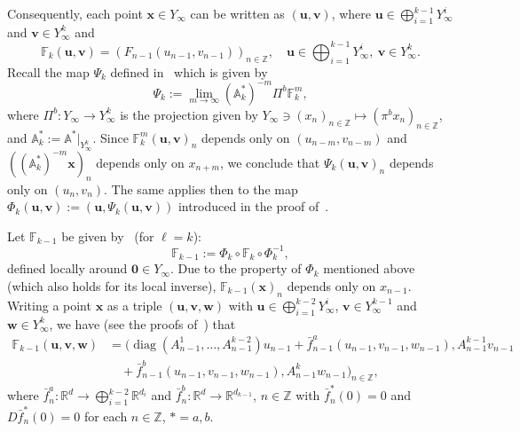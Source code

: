 \documentclass[reqno, a4paper, 10pt]{amsart}
\theoremstyle{plain}
\numberwithin{equation}{section}
\theoremstyle{remark}
\DeclareMathOperator{\diag}{diag}
\begin{document}
Consequently, each point $\mathbf x\in Y_\infty$ can be written as $(\mathbf u, \mathbf v)$, where $\mathbf u\in \bigoplus_{i=1}^{k-1}Y_\infty^i$ and $\mathbf v\in Y_\infty^k$ and
\[
\mathbb F_k(\mathbf u, \mathbf v)=(F_{n-1}(u_{n-1}, v_{n-1}))_{n\in \mathbb Z}, \quad \mathbf u\in \bigoplus_{i=1}^{k-1}Y_\infty^i, \ \mathbf v\in Y_\infty^k.
\]
Recall the map $\Psi_k$ defined in~\cite[Section 5]{ZZJ} which is given by
\[
\Psi_k:=\lim_{m\to \infty}(\mathbb A^\ast_k)^{-m}\Pi^b\mathbb F_k^m,
\]
where $\Pi^b \colon Y_\infty \to Y_\infty^k$ is the projection given by $Y_\infty \ni (x_n)_{n\in \mathbb Z}\mapsto (\pi^b x_n)_{n\in \mathbb Z}$, and $\mathbb A_k^\ast:=\mathbb A^\ast \rvert_{Y_\infty^k}$.
Since $\mathbb F_k^m(\mathbf u, \mathbf v)_n$ depends only on $(u_{n-m}, v_{n-m})$ and $((\mathbb A^\ast_k)^{-m}\mathbf x)_n$ depends only on $x_{n+m}$, we conclude that $\Psi_k(\mathbf u, \mathbf v)_n$ depends only on $(u_n, v_n)$. The same applies then to the map $\Phi_k(\mathbf u, \mathbf v):=(\mathbf u, \Psi_k(\mathbf u, \mathbf v))$ introduced in the proof of~\cite[Lemma 10]{ZZJ}.

Let $\mathbb F_{k-1}$ be given by~\cite[Eq. (5.14)]{ZZJ} (for $\ell=k$):
\[
\mathbb F_{k-1}:=\Phi_k \circ \mathbb F_{k}\circ \Phi_k^{-1},
\]
defined locally around $\mathbf 0\in Y_\infty$. Due to the property of $\Phi_k$ mentioned above (which also holds for its local inverse), $\mathbb F_{k-1}(\mathbf x)_n$ depends only on $x_{n-1}$.
Writing a point $\mathbf x$ as a triple $(\mathbf u, \mathbf v, \mathbf w)$ with $\mathbf u\in \bigoplus_{i=1}^{k-2}Y_\infty^i$, $\mathbf v\in Y_\infty^{k-1}$ and $\mathbf w\in Y_\infty^k$, we have (see the proofs of~\cite[Lemma 5 and Lemma 10]{ZZJ}) that 
\[
\begin{split}
\mathbb F_{k-1}(\mathbf u, \mathbf v, \mathbf w)
&=(\diag (A_{n-1}^1, \ldots, A_{n-1}^{k-2})u_{n-1}+\bar f_{n-1}^a(u_{n-1}, v_{n-1}, w_{n-1}), A_{n-1}^{k-1}v_{n-1}
\\
&\quad +\bar f_{n-1}^b(u_{n-1}, v_{n-1}, w_{n-1}), A_{n-1}^k w_{n-1})_{n\in \mathbb Z},
\end{split}
\]
where $\bar f_n^a \colon \mathbb R^d \to \bigoplus_{i=1}^{k-2}\mathbb R^{d_i}$ and $\bar f_n^b\colon \mathbb R^d \to \mathbb R^{d_{k-1}}$, $n\in \mathbb Z$ with $\bar f_n^*(0)=0$ and $D\bar f_n^*(0)=0$ for each $n\in \mathbb Z$, $*=a, b$.
\end{document}
